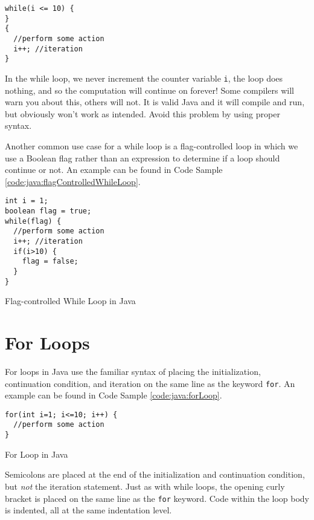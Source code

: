 \begin{verbatim}
while(i <= 10) {
}
{
  //perform some action
  i++; //iteration
}
\end{verbatim}

In the while loop, we never increment the counter variable \texttt{i}, 
the loop does nothing, and so the computation will continue on
forever!  Some compilers will warn you about this, others will not.  It
is valid Java and it will compile and run, but obviously won't work as intended.
Avoid this problem by using proper syntax.

Another common use case for a while loop is a flag-controlled loop in which
we use a Boolean flag rather than an expression to determine if a loop
should continue or not.  An example
can be found in Code Sample \ref{code:java:flagControlledWhileLoop}.

\begin{listing}
\begin{verbatim}
int i = 1;
boolean flag = true;
while(flag) {
  //perform some action
  i++; //iteration  
  if(i>10) {
    flag = false;
  }
}
\end{verbatim}
  \caption{Flag-controlled While Loop in Java}
  \label{code:java:flagControlledWhileLoop}
\end{listing}

\section{For Loops}

For loops in Java use the familiar syntax of placing the initialization, continuation
condition, and iteration on the same line as the keyword \texttt{for}.
An example can be found in Code Sample \ref{code:java:forLoop}.

\begin{listing}[!h]
\begin{verbatim}
for(int i=1; i<=10; i++) {
  //perform some action
}
\end{verbatim}
  \caption{For Loop in Java}
  \label{code:java:forLoop}
\end{listing}

Semicolons are placed at the end of the initialization and
continuation condition, but \emph{not} the iteration statement.  Just as with while
loops, the opening curly bracket is placed on the same line as the \texttt{for}
keyword.  Code within the loop body is indented, all at the same indentation level.

